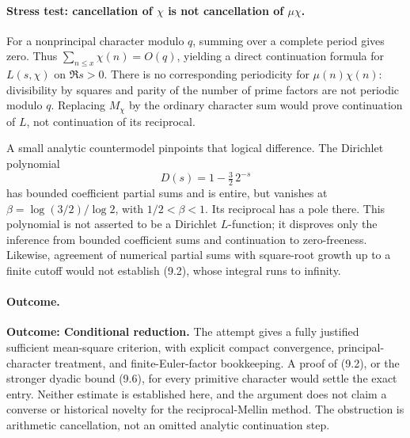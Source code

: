 \documentclass[11pt,a4paper]{article}
\begin{document}
\paragraph{Stress test: cancellation of $\chi$ is not cancellation of $\mu\chi$.}
For a nonprincipal character modulo $q$, summing over a complete period
gives zero. Thus $\sum_{n\leq x}\chi(n)=O(q)$, yielding a direct
continuation formula for $L(s,\chi)$ on $\Re s>0$. There is no corresponding
periodicity for $\mu(n)\chi(n)$: divisibility by squares and parity of
the number of prime factors are not periodic modulo $q$. Replacing
$M_\chi$ by the ordinary character sum would prove continuation of
$L$, not continuation of its reciprocal.

A small analytic countermodel pinpoints that logical difference. The
Dirichlet polynomial
\[
 D(s)=1-\tfrac32\,2^{-s}
\]
has bounded coefficient partial sums and is entire, but vanishes at
$\beta=\log(3/2)/\log2$, with $1/2<\beta<1$. Its reciprocal has a pole
there. This polynomial is not asserted to be a Dirichlet $L$-function;
it disproves only the inference from bounded coefficient sums and
continuation to zero-freeness. Likewise, agreement of numerical partial
sums with square-root growth up to a finite cutoff would not establish
(9.2), whose integral runs to infinity.

\paragraph{Outcome.}
\textbf{Outcome: Conditional reduction.}
The attempt gives a fully justified sufficient mean-square criterion,
with explicit compact convergence, principal-character treatment, and
finite-Euler-factor bookkeeping. A proof of (9.2), or the stronger
dyadic bound (9.6), for every primitive character would settle the exact
entry. Neither estimate is established here, and the argument does not
claim a converse or historical novelty for the reciprocal-Mellin method.
The obstruction is arithmetic cancellation, not an omitted analytic
continuation step.
\end{document}
